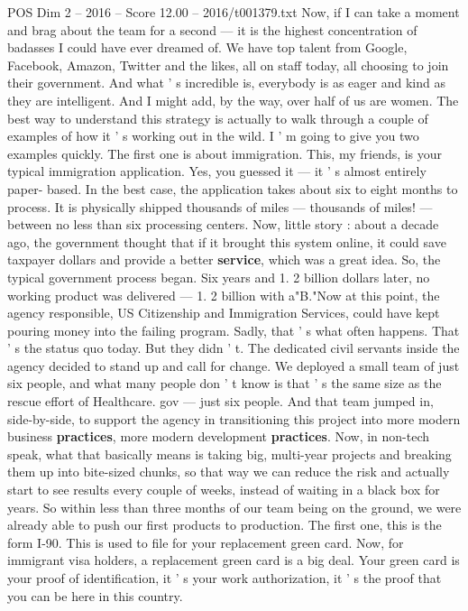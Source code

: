 \begin{textsample}{POS Dim 2 – 2016 – Score 12.00 – 2016/t001379.txt}
Now, if I can take a moment and brag about the team for a second — it is the highest concentration of badasses I could have ever dreamed of.
We have top talent from Google, Facebook, Amazon, Twitter and the likes, all on staff today, all choosing to join their government.
And what ' s incredible is, everybody is as eager and kind as they are intelligent.
And I might add, by the way, over half of us are women.
The best way to understand this strategy is actually to walk through a couple of examples of how it ' s working out in the wild.
I ' m going to give you two examples quickly.
The first one is about immigration.
This, my friends, is your typical immigration application.
Yes, you guessed it — it ' s almost entirely paper- based.
In the best case, the application takes about six to eight months to process.
It is physically shipped thousands of miles — thousands of miles! — between no less than six processing centers.
Now, little story : about a decade ago, the government thought that if it brought this system online, it could save taxpayer dollars and provide a better \textbf{service}, which was a great idea.
So, the typical government process began.
Six years and 1. 2 billion dollars later, no working product was delivered — 1. 2 billion with a"B."Now at this point, the agency responsible, US Citizenship and Immigration Services, could have kept pouring money into the failing program.
Sadly, that ' s what often happens.
That ' s the status quo today.
But they didn ' t.
The dedicated civil servants inside the agency decided to stand up and call for change.
We deployed a small team of just six people, and what many people don ' t know is that ' s the same size as the rescue effort of Healthcare. gov — just six people.
And that team jumped in, side-by-side, to support the agency in transitioning this project into more modern business \textbf{practices}, more modern development \textbf{practices}.
Now, in non-tech speak, what that basically means is taking big, multi-year projects and breaking them up into bite-sized chunks, so that way we can reduce the risk and actually start to see results every couple of weeks, instead of waiting in a black box for years.
So within less than three months of our team being on the ground, we were already able to push our first products to production.
The first one, this is the form I-90.
This is used to file for your replacement green card.
Now, for immigrant visa holders, a replacement green card is a big deal.
Your green card is your proof of identification, it ' s your work authorization, it ' s the proof that you can be here in this country.

\end{textsample}
